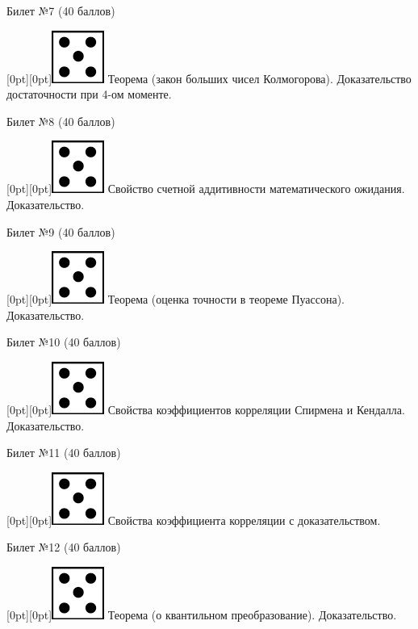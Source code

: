 \documentclass[10pt]{article}
\begin{document}
\begin{center} {\Large Билет №7 (40 баллов)} \end{center}
\raisebox{-1pt}[0pt][0pt]{\includegraphics[width=0.02\linewidth]{5.png}} Теорема (закон больших чисел Колмогорова). Доказательство достаточности при 4-ом моменте. \\
\begin{center} {\Large Билет №8 (40 баллов)} \end{center}
\raisebox{-1pt}[0pt][0pt]{\includegraphics[width=0.02\linewidth]{5.png}}  Свойство счетной аддитивности математического ожидания. Доказательство. \\
\begin{center} {\Large Билет №9 (40 баллов)} \end{center}
\raisebox{-1pt}[0pt][0pt]{\includegraphics[width=0.02\linewidth]{5.png}} Теорема (оценка точности в теореме Пуассона). Доказательство. \\
\begin{center} {\Large Билет №10 (40 баллов)} \end{center}
\raisebox{-1pt}[0pt][0pt]{\includegraphics[width=0.02\linewidth]{5.png}} Свойства коэффициентов корреляции Спирмена и Кендалла. Доказательство. \\ 
\begin{center} {\Large Билет №11 (40 баллов)} \end{center}
\raisebox{-1pt}[0pt][0pt]{\includegraphics[width=0.02\linewidth]{5.png}} Свойства коэффициента корреляции с доказательством. \\
\begin{center} {\Large Билет №12 (40 баллов)} \end{center}
\raisebox{-1pt}[0pt][0pt]{\includegraphics[width=0.02\linewidth]{5.png}}  Теорема (о квантильном преобразование). Доказательство. \\
\end{document}
